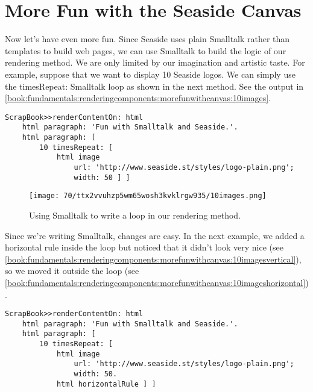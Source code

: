 \documentclass[a4paper,10pt,twoside]{book}
\newcommand{\ct}[1]{{\small\ttfamily\textup{#1}}}
\begin{document}
\section{More Fun with the Seaside Canvas}
\label{book:fundamentals:renderingcomponents:morefunwithcanvas}

Now let's have even more fun.  Since Seaside uses plain Smalltalk
rather than templates to build web pages, we can use Smalltalk to
build the logic of our rendering method.  We are only limited by our imagination and artistic taste.  For example, suppose that we want to display 10 Seaside logos.  We can simply use the \ct{timesRepeat:} Smalltalk loop as shown in the next method.  See the output in \autoref{book:fundamentals:renderingcomponents:morefunwithcanvas:10images}.

\begin{lstlisting}
ScrapBook>>renderContentOn: html
    html paragraph: 'Fun with Smalltalk and Seaside.'.
    html paragraph: [
        10 timesRepeat: [
            html image
                url: 'http://www.seaside.st/styles/logo-plain.png';
                width: 50 ] ]
\end{lstlisting}

\begin{figure}[h!tbp]
	\begin{center}
		\texttt{[image: 70/ttx2vvuhzp5wm65wosh3kvklrgw935/10images.png]}
		\caption{Using Smalltalk to write a loop in our rendering method.\label{book:fundamentals:renderingcomponents:morefunwithcanvas:10images}}
	\end{center}
\end{figure}


Since we're writing Smalltalk, changes are easy.  In the next example, we added a horizontal rule inside the loop but noticed that it didn't look very nice (see \autoref{book:fundamentals:renderingcomponents:morefunwithcanvas:10imagesvertical}), so we moved it outside the loop (see \autoref{book:fundamentals:renderingcomponents:morefunwithcanvas:10imageshorizontal}).

\begin{lstlisting}
ScrapBook>>renderContentOn: html
    html paragraph: 'Fun with Smalltalk and Seaside.'.
    html paragraph: [
        10 timesRepeat: [
            html image
                url: 'http://www.seaside.st/styles/logo-plain.png';
                width: 50.
            html horizontalRule ] ]
\end{lstlisting}
\end{document}
